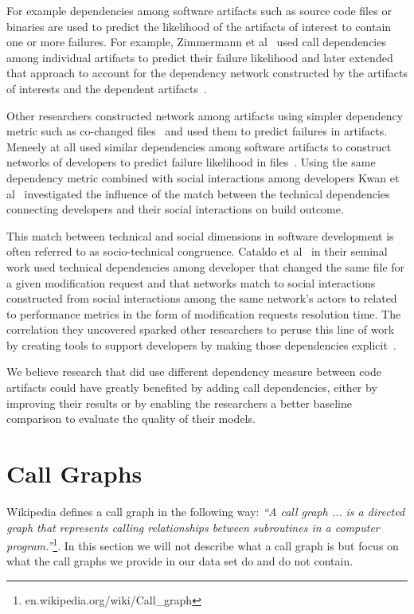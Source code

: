 \documentclass[conference]{IEEEtran}
\begin{document}
For example dependencies among software artifacts such as source code files or binaries are used to predict the likelihood of the artifacts of interest to contain one or more failures.
For example, Zimmermann et al~\cite{zimmermann:icse:2008} used call dependencies among individual artifacts to predict their failure likelihood and later extended that approach to account for the dependency network constructed by the artifacts of interests and the dependent artifacts~\cite{zimmermann:esem:2009}.

Other researchers constructed network among artifacts using simpler dependency metric such as co-changed files~\cite{pinzger:fse:2008} and used them to predict failures in artifacts.
Meneely at all used similar dependencies among software artifacts to construct networks of developers to predict failure likelihood in files~\cite{meneely:fse:2008}.
Using the same dependency metric combined with social interactions among developers Kwan et al~\cite{kwan:tse:2011} investigated the influence of the match between the technical dependencies connecting developers and their social interactions on build outcome.

This match between technical and social dimensions in software development is often referred to as socio-technical congruence.
Cataldo et al~\cite{cataldo:cscw:2006} in their seminal work used technical dependencies among developer that changed the same file for a given modification request and that networks match to social interactions constructed from social interactions among the same network's actors to related to performance metrics in the form of modification requests resolution time.
The correlation they uncovered sparked other researchers to peruse this line of work by creating tools to support developers by making those dependencies explicit~\cite{trainer2005:ariadne,sarma:icse:2009}.

We believe research that did use different dependency measure between code artifacts could have greatly benefited by adding call dependencies, either by improving their results or by enabling the researchers a better baseline comparison to evaluate the quality of their models.




\section{Call Graphs}
\label{sec:cg}
Wikipedia defines a call graph in the following way:
\emph{``A call graph ... is a directed graph that represents calling relationships between subroutines in a computer program.''}\footnote{en.wikipedia.org/wiki/Call\_graph}.
In this section we will not describe what a call graph is but focus on what the call graphs we provide in our data set do and do not contain.
\end{document}
